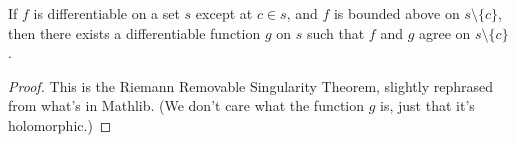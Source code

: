 \begin{theorem}
\label{existsDifferentiableOn_of_bddAbove}
\leanok
If $f$ is differentiable on a set $s$ except at $c\in s$,
  and $f$ is bounded above on $s\setminus\{c\}$, then there
  exists a differentiable function $g$ on $s$ such that $f$
  and $g$ agree on $s\setminus\{c\}$.
\end{theorem}
\begin{proof}
\leanok
This is the Riemann Removable Singularity Theorem, slightly
  rephrased from what's in Mathlib. (We don't care what the
  function $g$ is, just that it's holomorphic.)
\end{proof}
